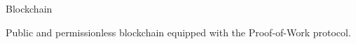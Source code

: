 \documentclass{beamer}
\newcommand\blfootnote[1]{%
  \begingroup
  \renewcommand\thefootnote{}\footnote{#1}%
  \addtocounter{footnote}{-1}%
  \endgroup
}
\begin{document}
\begin{frame}{Blockchain}
\vspace{0.2cm}
\begin{tcolorbox}[enhanced,drop shadow, title=Focus of the talk]
Public and permissionless blockchain equipped with the Proof-of-Work protocol.
\end{tcolorbox}
\end{frame}

\end{document}
